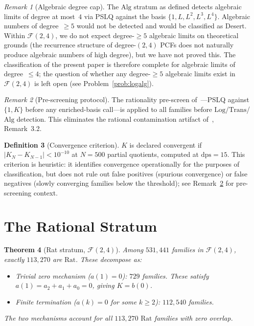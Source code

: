 \documentclass{amsart}
\newtheorem{theorem}{Theorem}[section]
\theoremstyle{definition}
\newtheorem{definition}[theorem]{Definition}
\theoremstyle{remark}
\newtheorem{remark}[theorem]{Remark}
\newcommand{\FF}{\mathcal{F}}
\newcommand{\Rat}{\mathrm{Rat}}
\newcommand{\Log}{\mathrm{Log}}
\newcommand{\Alg}{\mathrm{Alg}}
\newcommand{\Trans}{\mathrm{Trans}}
\newcommand{\dps}{\mathrm{dps}}
\newcommand{\abs}[1]{\lvert #1 \rvert}
\begin{document}
\begin{remark}[Algebraic degree cap]\label{rem:algcap}
The $\Alg$ stratum as defined detects algebraic limits of
degree at most~$4$ via PSLQ against the basis
$\{1, L, L^2, L^3, L^4\}$. Algebraic numbers of degree~$\ge 5$
would not be detected and would be classified as Desert.
Within $\FF(2,4)$, we do not expect degree-$\ge 5$ algebraic
limits on theoretical grounds (the recurrence structure
of degree-$(2,4)$ PCFs does not naturally produce algebraic
numbers of high degree), but we have not proved this.
The classification of the present paper is therefore complete
for algebraic limits of degree~$\le 4$; the question of
whether any degree-$\ge 5$ algebraic limits exist in $\FF(2,4)$
is left open (see Problem~\ref{prob:logalg}).
\end{remark}

\begin{remark}[Pre-screening protocol]\label{rem:prescreen}
The rationality pre-screen of~\cite{contamination}---PSLQ against
$\{1, K\}$ before any enriched-basis call---is applied to all families
before $\Log$/$\Trans$/$\Alg$ detection.  This eliminates the rational
contamination artifact of~\cite{contamination}, Remark~3.2.
\end{remark}

\begin{definition}[Convergence criterion]\label{def:conv}
$K$ is declared convergent if $\abs{K_N - K_{N-1}} < 10^{-10}$ at $N = 500$
partial quotients, computed at $\dps = 15$.
This criterion is heuristic: it identifies convergence
operationally for the purposes of classification, but does
not rule out false positives (spurious convergence) or false
negatives (slowly converging families below the threshold);
see Remark~\ref{rem:prescreen} for pre-screening context.
\end{definition}

\section{The Rational Stratum}\label{sec:rat}

\begin{theorem}[Rat stratum, $\FF(2,4)$]\label{thm:rat}
Among $531{,}441$ families in $\FF(2,4)$, exactly $113{,}270$ are $\Rat$.
These decompose as:
\begin{itemize}[leftmargin=2em]
\item \emph{Trivial zero mechanism} ($a(1) = 0$): $729$ families.
  These satisfy $a(1) = a_2 + a_1 + a_0 = 0$, giving $K = b(0)$.
\item \emph{Finite termination} ($a(k) = 0$ for some $k \ge 2$):
  $112{,}540$ families.
\end{itemize}
The two mechanisms account for all $113{,}270$ $\Rat$ families with zero
overlap.
\end{theorem}
\end{document}
